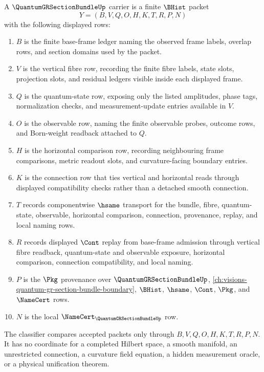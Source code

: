 \begin{definition}
\label{def:quantum-gr-section-bundle-carrier}
A $\QuantumGRSectionBundleUp$ carrier is a finite $\BHist$ packet
$$
Y=(B,V,Q,O,H,K,T,R,P,N)
$$
with the following displayed rows:
\begin{enumerate}
\item $B$ is the finite base-frame ledger naming the observed frame labels, overlap rows, and section domains used by the packet.
\item $V$ is the vertical fibre row, recording the finite fibre labels, state slots, projection slots, and residual ledgers visible inside each displayed frame.
\item $Q$ is the quantum-state row, exposing only the listed amplitudes, phase tags, normalization checks, and measurement-update entries available in $V$.
\item $O$ is the observable row, naming the finite observable probes, outcome rows, and Born-weight readback attached to $Q$.
\item $H$ is the horizontal comparison row, recording neighbouring frame comparisons, metric readout slots, and curvature-facing boundary entries.
\item $K$ is the connection row that ties vertical and horizontal reads through displayed compatibility checks rather than a detached smooth connection.
\item $T$ records componentwise $\hsame$ transport for the bundle, fibre, quantum-state, observable, horizontal comparison, connection, provenance, replay, and local naming rows.
\item $R$ records displayed $\Cont$ replay from base-frame admission through vertical fibre readback, quantum-state and observable exposure, horizontal comparison, connection compatibility, and local naming.
\item $P$ is the $\Pkg$ provenance over $\QuantumGRSectionBundleUp$, \autoref{ch:visions-quantum-gr-section-bundle-boundary}, $\BHist$, $\hsame$, $\Cont$, $\Pkg$, and $\NameCert$ rows.
\item $N$ is the local $\NameCert_{\QuantumGRSectionBundleUp}$ row.
\end{enumerate}
The classifier compares accepted packets only through $B,V,Q,O,H,K,T,R,P,N$. It has no coordinate for a completed Hilbert space, a smooth manifold, an unrestricted connection, a curvature field equation, a hidden measurement oracle, or a physical unification theorem.
\end{definition}

